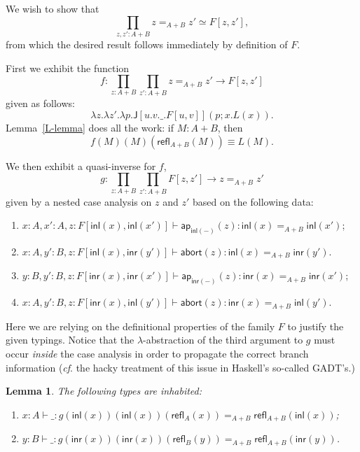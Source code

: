 \documentclass{article}
\newcommand{\abort}[1]{\mathsf{abort}(#1)}
\newcommand{\sumty}[2]{{#1}+{#2}}
\newcommand{\inleft}[1]{\mathsf{inl}(#1)}
\newcommand{\inright}[1]{\mathsf{inr}{(#1)}}
\newcommand{\idty}[3]{{#2}\mathbin{=_{#1}}{#3}}
\newcommand{\refl}[2]{\mathsf{refl}_{#1}({#2})}
\newcommand{\idelim}[4]{\mathsf{J}[{#1}]({#2};{#3}{.}{#4})}
\newcommand{\family}[2]{{#1}.{#2}}
\newcommand{\familytwo}[3]{\family{#1}{\family{#2}{#3}}}
\newcommand{\familythree}[4]{\family{#1}{\familytwo{#2}{#3}{#4}}}
\newcommand{\prodty}[3]{\prod_{{#1}{:}{#2}}{#3}}
\newcommand{\lam}[2]{\lambda {#1}{.}{#2}}
\newcommand{\app}[2]{{#1}({#2})}
\newcommand{\pa}[1]{\mathsf{ap}_{#1}}
\newtheorem{lemma}[theorem]{Lemma}
\begin{document}
We wish to show that $$\prodty{z,z'}{\sumty{A}{B}}{\idty{\sumty{A}{B}}{z}{z'}}\simeq F[z,z'],$$ from which the desired result follows immediately by definition of $F$.

First we exhibit the function
$$f:\prodty{z}{\sumty{A}{B}}{\prodty{z'}{\sumty{A}{B}}{\idty{\sumty{A}{B}}{z}{z'}\to F[z,z']}}$$
given as follows:
$$\lam{z}{\lam{z'}{\lam{p}{\idelim{\familythree{u}{v}{\_}{F[u,v]}}{p}{x}{\app{L}{x}}}}}.$$
Lemma~\ref{L-lemma} does all the work: if $M:\sumty{A}{B}$, then $$\app{\app{\app{f}{M}}{M}}{\refl{\sumty{A}{B}}{M}}\equiv \app{L}{M}.$$

We then exhibit a quasi-inverse for $f$,
$$g:\prodty{z}{\sumty{A}{B}}{\prodty{z'}{\sumty{A}{B}}{F[z,z']\to\idty{\sumty{A}{B}}{z}{z'}}}$$
given by a nested case analysis on $z$ and $z'$ based on the following data:
\begin{enumerate}
\item $x:A,x':A,z:F[\inleft{x},\inleft{x'}]\vdash \app{\pa{\inleft{-}}}{z}:\idty{\sumty{A}{B}}{\inleft{x}}{\inleft{x'}}$;
\item $x:A,y':B,z:F[\inleft{x},\inright{y'}]\vdash \abort{z}:\idty{\sumty{A}{B}}{\inleft{x}}{\inright{y'}}$.
\item $y:B,y':B,z:F[\inright{x},\inright{x'}]\vdash \app{\pa{\inright{-}}}{z}:\idty{\sumty{A}{B}}{\inright{x}}{\inright{x'}}$;
\item $x:A,y':B,z:F[\inright{x},\inleft{y'}]\vdash \abort{z}:\idty{\sumty{A}{B}}{\inright{x}}{\inleft{y'}}$.
\end{enumerate}
Here we are relying on the definitional properties of the family $F$ to justify the given typings.  Notice that the $\lambda$-abstraction of the third argument to $g$ must occur \emph{inside} the case analysis in order to propagate the correct branch information (\textit{cf}. the hacky treatment of this issue in Haskell's so-called GADT's.)

\begin{lemma} 
  \label{g-lemma}
  The following types are inhabited:
  \begin{enumerate}
  \item $x:A\vdash \_ : \idty{\sumty{A}{B}}{\app{\app{\app{g}{\inleft{x}}}{\inleft{x}}}{\refl{A}{x}}}{\refl{\sumty{A}{B}}{\inleft{x}}}$;
  \item $y:B\vdash \_ : \idty{\sumty{A}{B}}{\app{\app{\app{g}{\inright{x}}}{\inright{x}}}{\refl{B}{y}}}{\refl{\sumty{A}{B}}{\inright{y}}}$.
  \end{enumerate}
\end{lemma}
\end{document}
